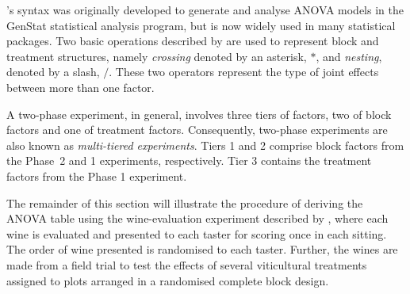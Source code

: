 \citeauthor{Wilkinson1973}'s syntax was originally developed to generate and analyse ANOVA models in the GenStat statistical analysis program, but is now widely used in many statistical packages. Two basic operations described by \cite{Wilkinson1973} are used to represent block and treatment structures, namely \emph{crossing} denoted by an asterisk, $*$, and \emph{nesting}, denoted by a slash, $/$. These two operators represent the type of joint effects between more than one factor. 

A two-phase experiment, in general, involves three tiers of factors, two of block factors and one of treatment factors. Consequently, two-phase experiments are also known as \emph{multi-tiered experiments}. Tiers 1 and 2 comprise block factors from the Phase~2 and 1 experiments, respectively. Tier 3 contains the treatment factors from the Phase 1 experiment. 

The remainder of this section will illustrate the procedure of deriving the ANOVA table using the wine-evaluation experiment described by \cite{Brien1983}, where each wine is evaluated and presented to each taster for scoring once in each sitting. The order of wine presented is randomised to each taster. Further, the wines are made from a field trial to test the effects of several viticultural treatments assigned to plots arranged in a randomised complete block design. 

